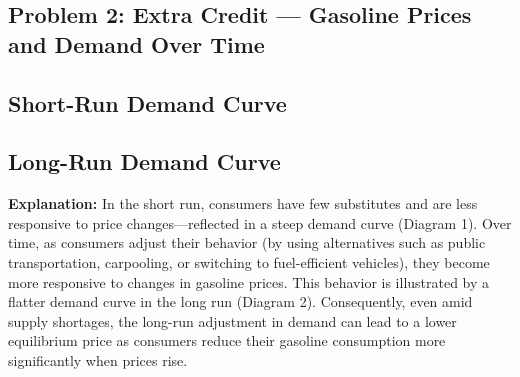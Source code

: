 \documentclass[12pt]{article}
\begin{document}
\subsection*{Problem 2: Extra Credit --- Gasoline Prices and Demand Over Time}
\subsection*{Short-Run Demand Curve}

\bigskip

\subsection*{Long-Run Demand Curve}

\bigskip

\textbf{Explanation:}
In the short run, consumers have few substitutes and are less responsive to price changes—reflected in a steep demand curve (Diagram 1). Over time, as consumers adjust their behavior (by using alternatives such as public transportation, carpooling, or switching to fuel-efficient vehicles), they become more responsive to changes in gasoline prices. This behavior is illustrated by a flatter demand curve in the long run (Diagram 2). Consequently, even amid supply shortages, the long-run adjustment in demand can lead to a lower equilibrium price as consumers reduce their gasoline consumption more significantly when prices rise.
\end{document}
